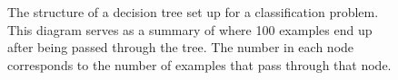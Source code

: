 \begin{figure}[h]
  \centering
  \caption{The structure of a decision tree set up for a classification problem.
  This diagram serves as a summary of where 100 examples end up after being
  passed through the tree. The number in each node corresponds to the number of
  examples that pass through that node.}
  \label{fig:bdt}
\end{figure}


